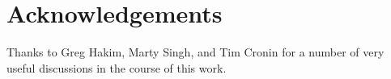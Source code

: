 \documentclass[12pt]{article}
\begin{document}
\section{Acknowledgements}
Thanks to Greg Hakim, Marty Singh, and Tim Cronin for a number of very useful discussions in the course of this work.

\end{document}
